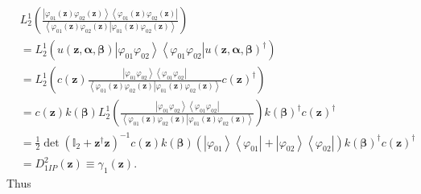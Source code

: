 \documentclass[aps,preprint]{revtex4}%
\begin{document}
\begin{align}
&  L_{2}^{1}\left(  \frac{\left\vert \varphi_{01}\left(  \mathbf{z}\right)
\varphi_{02}\left(  \mathbf{z}\right)  \right\rangle \left\langle \varphi
_{01}\left(  \mathbf{z}\right)  \varphi_{02}\left(  \mathbf{z}\right)
\right\vert }{\left\langle \varphi_{01}\left(  \mathbf{z}\right)  \varphi
_{02}\left(  \mathbf{z}\right)  \left\vert \varphi_{01}\left(  \mathbf{z}%
\right)  \varphi_{02}\left(  \mathbf{z}\right)  \right.  \right\rangle
}\right)  \nonumber\\
&  =L_{2}^{1}\left(  u\left(  \mathbf{z,\alpha,\beta}\right)  \left\vert
\varphi_{01}\varphi_{02}\right\rangle \left\langle \varphi_{01}\varphi
_{02}\right\vert u\left(  \mathbf{z,\alpha,\beta}\right)  ^{\dagger}\right)
\nonumber\\
&  =L_{2}^{1}\left(  c\left(  \mathbf{z}\right)  \frac{\left\vert \varphi
_{01}\varphi_{02}\right\rangle \left\langle \varphi_{01}\varphi_{02}%
\right\vert }{\left\langle \varphi_{01}\left(  \mathbf{z}\right)  \varphi
_{02}\left(  \mathbf{z}\right)  \left\vert \varphi_{01}\left(  \mathbf{z}%
\right)  \varphi_{02}\left(  \mathbf{z}\right)  \right.  \right\rangle
}c\left(  \mathbf{z}\right)  ^{\dagger}\right)  \nonumber\\
&  =c\left(  \mathbf{z}\right)  k\left(  \mathbf{\beta}\right)  L_{2}%
^{1}\left(  \frac{\left\vert \varphi_{01}\varphi_{02}\right\rangle
\left\langle \varphi_{01}\varphi_{02}\right\vert }{\left\langle \varphi
_{01}\left(  \mathbf{z}\right)  \varphi_{02}\left(  \mathbf{z}\right)
\left\vert \varphi_{01}\left(  \mathbf{z}\right)  \varphi_{02}\left(
\mathbf{z}\right)  \right.  \right\rangle }\right)  k\left(  \mathbf{\beta
}\right)  ^{\dagger}c\left(  \mathbf{z}\right)  ^{\dagger}\nonumber\\
&  =\frac{1}{2}\det\left(  \mathbb{I}_{2}+\mathbf{z}^{\dagger}\mathbf{z}%
\right)  ^{-1}c\left(  \mathbf{z}\right)  k\left(  \mathbf{\beta}\right)
\left(  \left\vert \varphi_{01}\right\rangle \left\langle \varphi
_{01}\right\vert +\left\vert \varphi_{02}\right\rangle \left\langle
\varphi_{02}\right\vert \right)  k\left(  \mathbf{\beta}\right)  ^{\dagger
}c\left(  \mathbf{z}\right)  ^{\dagger}\nonumber\\
&  =D_{1IP}^{2}\left(  \mathbf{z}\right)  \equiv\gamma_{1}\left(
\mathbf{z}\right)  .
\end{align}
Thus
\end{document}
